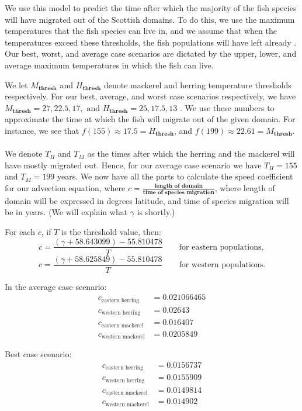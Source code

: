 \documentclass[12pt]{article}
\begin{document}
We use this model to predict the time after which the majority of the fish species will have migrated out of the Scottish domains. To do this, we use the maximum temperatures that the fish species can live in, and we assume that when the temperatures exceed these thresholds, the fish populations will have left already \cite{gigy_smalls}. Our best, worst, and average case scenarios are dictated by the upper, lower, and average maximum temperatures in which the fish can live.

We let $M_{\textbf{thresh}}$ and $H_{\textbf{thresh}}$ denote mackerel and herring temperature thresholds respectively. For our best, average, and worst case scenarios respectively, we have $M_{\textbf{thresh}}=27,22.5,17,$ and $H_{\textbf{thresh}}=25,17.5,13$ \cite{ICES_mackerel, herr_SSB}. 
We use these numbers to approximate the time at which the fish will migrate out of the given domain. For instance, we see that $f(155) \approx 17.5 = H_{\textbf{thresh}}$, and $f(199) \approx 22.61 = M_{\textbf{thresh}}$.\\\\
We denote $T_H$ and $T_M$ as the times after which the herring and the mackerel will have mostly migrated out. Hence, for our average case scenario we have
$T_H=155$ and $T_M= 199$ years.
We now have all the parts to calculate the speed coefficient for our advection equation, where $c= \frac{\textbf{length of domain}}{\textbf{time of species migration}}$, where length of domain will be expressed in degrees latitude, and time of species migration will be in years. (We will explain what $\gamma$ is shortly.)

For each $c$, if $T$ is the threshold value, then:
\[c = \frac{(\gamma + 58.643099) - 55.810478}{T} \qquad \text{for eastern populations},\]
\[c = \frac{(\gamma + 58.625849) - 55.810478}{T} \qquad \text{for western populations}.\]

In the average case scenario:
\begin{align*}
    c_{\textrm{eastern herring}} &= 0.021066465 \\
    c_{\textrm{western herring}} &= 0.02643 \\
    c_{\textrm{eastern mackerel}} &= 0.016407 \\
    c_{\textrm{western mackerel}} &= 0.0205849 
\end{align*}

Best case scenario:
\begin{align*}
    c_{\textrm{eastern herring}} &=  0.0156737\\
    c_{\textrm{western herring}} &= 0.0155909 \\
    c_{\textrm{eastern mackerel}} &= 0.0149814 \\
    c_{\textrm{western mackerel}} &= 0.014902
\end{align*}
\end{document}
